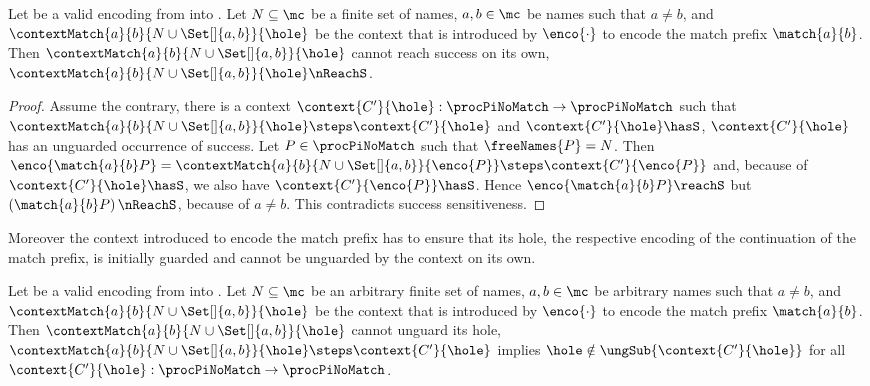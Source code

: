 \documentclass[]{article}
\begin{document}
\begin{lemma}
	\label{lem:contextCannotReachSuccess}
	Let \encod be a valid encoding from \piT into \piNM.
	Let $ N \subseteq \mc $ be a finite set of names,
	$ a, b \in \mc $ be names such that $ a \neq b $,
	and $ \contextMatch{a}{b}{N \cup \Set[]{ a, b }}{\hole} $ be the context that is introduced by $ \enco{\cdot} $ to encode the match prefix $ \match{a}{b} $. Then $ \contextMatch{a}{b}{N \cup \Set[]{ a, b }}{\hole} $ cannot reach success on its own, \ie $ \contextMatch{a}{b}{N \cup \Set[]{ a, b }}{\hole} \nReachS $.
\end{lemma}

\begin{proof}
	Assume the contrary, \ie there is a context $ \context{C'}{\hole} : \procPiNoMatch \to \procPiNoMatch $ such that $ \contextMatch{a}{b}{N \cup \Set[]{ a, b }}{\hole} \steps \context{C'}{\hole} $ and $ \context{C'}{\hole} \hasS $, \ie $ \context{C'}{\hole} $ has an unguarded occurrence of success. Let $ P \in \procPiNoMatch $ such that $ \freeNames{P} = N $. Then $ \enco{\match{a}{b}P} = \contextMatch{a}{b}{N \cup \Set[]{ a, b }}{\enco{P}} \steps \context{C'}{\enco{P}} $ and, because of $ \context{C'}{\hole} \hasS $, we also have $ \context{C'}{\enco{P}} \hasS $. Hence $ \enco{\match{a}{b}P} \reachS $ but $ \left( \match{a}{b}P \right) \nReachS $, because of $ a \neq b $. This contradicts success sensitiveness.
\end{proof}

Moreover the context introduced to encode the match prefix has to ensure that its hole, \ie the respective encoding of the continuation of the match prefix, is initially guarded and cannot be unguarded by the context on its own.

\begin{lemma}
	\label{lem:contextNotUnguardContinuation}
	Let \encod be a valid encoding from \piT into \piNM.
	Let $ N \subseteq \mc $ be an arbitrary finite set of names,
	$ a, b \in \mc $ be arbitrary names such that $ a \neq b $,
	and $ \contextMatch{a}{b}{N \cup \Set[]{ a, b }}{\hole} $ be the context that is introduced by $ \enco{\cdot} $ to encode the match prefix $ \match{a}{b} $. Then $ \contextMatch{a}{b}{N \cup \Set[]{ a, b }}{\hole} $ cannot unguard its hole, \ie $ \contextMatch{a}{b}{N \cup \Set[]{ a, b }}{\hole} \steps \context{C'}{\hole} $ implies $ \hole \notin \ungSub{\context{C'}{\hole}} $ for all $ \context{C'}{\hole} : \procPiNoMatch \to \procPiNoMatch $.
\end{lemma}
\end{document}
